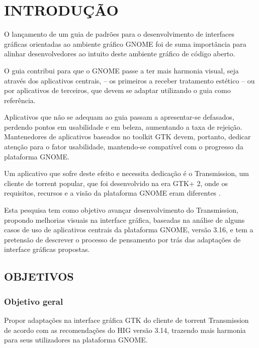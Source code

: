 \documentclass[
    12pt,               %
    openright,          %
    oneside,            %
    a4paper,            %
    chapter=TITLE,      %
    section=TITLE,      %
    brazil              %
]{abntex2}
\begin{document}
\textual

\chapter{INTRODUÇÃO}

O lançamento de um guia de padrões para o desenvolvimento de interfaces gráficas
orientadas ao ambiente gráfico GNOME foi de suma importância para alinhar
desenvolvedores ao intuito deste ambiente gráfico de código aberto.

O guia contribui para que o GNOME passe a ter mais harmonia visual, seja através
dos aplicativos centrais, -- os primeiros a receber tratamento estético -- ou
por aplicativos de terceiros, que devem se adaptar utilizando o guia como
referência.

Aplicativos que não se adequam ao guia passam a apresentar-se defasados,
perdendo pontos em usabilidade e em beleza, aumentando a taxa de rejeição.
Mantenedores de aplicativos baseados no toolkit GTK devem, portanto, dedicar
atenção para o fator usabilidade, mantendo-se compatível com o progresso da
plataforma GNOME.

Um aplicativo que sofre deste efeito e necessita dedicação é o Transmission, um
cliente de torrent popular, que foi desenvolvido na era GTK+ 2, onde os
requisitos, recursos e a visão da plataforma GNOME eram diferentes
\cite{gnome221hig}.

Esta pesquisa tem como objetivo avançar desenvolvimento do Transmission,
propondo melhorias visuais na interface gráfica, baseadas na análise de alguns
casos de uso de aplicativos centrais da plataforma GNOME, versão 3.16, e tem a
pretensão de descrever o processo de pensamento por trás das adaptações de
interface gráficas propostas.

\section{OBJETIVOS}

\subsection{Objetivo geral}

Propor adaptações na interface gráfica GTK do cliente de torrent Transmission de
acordo com as recomendações do HIG versão 3.14, trazendo mais harmonia para seus
utilizadores na plataforma GNOME.
\end{document}

